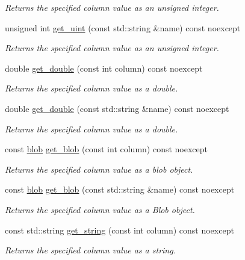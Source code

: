 \begin{DoxyCompactItemize}
\begin{DoxyCompactList}\small\item\em Returns the specified column value as an unsigned integer. \end{DoxyCompactList}\item 
unsigned int \hyperlink{a00010_a662bad64308f5995cb03a0ccb772acdc}{get\-\_\-uint} (const std\-::string \&name) const noexcept
\begin{DoxyCompactList}\small\item\em Returns the specified column value as an unsigned integer. \end{DoxyCompactList}\item 
double \hyperlink{a00010_aa4052f3e593580c81ba2b8622e2652eb}{get\-\_\-double} (const int column) const noexcept
\begin{DoxyCompactList}\small\item\em Returns the specified column value as a double. \end{DoxyCompactList}\item 
double \hyperlink{a00010_a0613aae6ee73cd54d7f7d0d711494737}{get\-\_\-double} (const std\-::string \&name) const noexcept
\begin{DoxyCompactList}\small\item\em Returns the specified column value as a double. \end{DoxyCompactList}\item 
const \hyperlink{a00002}{blob} \hyperlink{a00010_abd1b75c884158222778d2d6ec8b9ec18}{get\-\_\-blob} (const int column) const noexcept
\begin{DoxyCompactList}\small\item\em Returns the specified column value as a blob object. \end{DoxyCompactList}\item 
const \hyperlink{a00002}{blob} \hyperlink{a00010_a3a94b5c5a0d153ca7e2f0ef6719dfc9a}{get\-\_\-blob} (const std\-::string \&name) const noexcept
\begin{DoxyCompactList}\small\item\em Returns the specified column value as a Blob object. \end{DoxyCompactList}\item 
const std\-::string \hyperlink{a00010_a8716fe92a821ebc0799097bd6cc6d53c}{get\-\_\-string} (const int column) const noexcept
\begin{DoxyCompactList}\small\item\em Returns the specified column value as a string. \end{DoxyCompactList}\item 

\end{DoxyCompactItemize}
